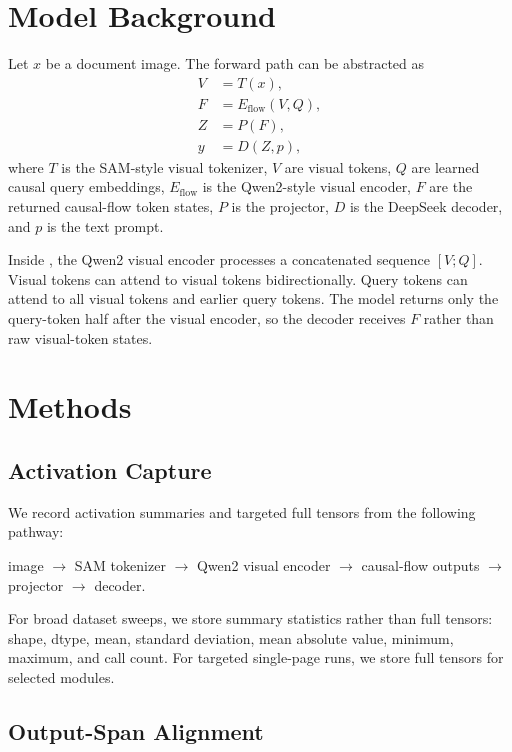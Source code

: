 \documentclass{article}
\begin{document}
\section{Model Background}

Let $x$ be a document image. The \modelname{} forward path can be abstracted as
\begin{align}
  V &= T(x), \\
  F &= E_{\mathrm{flow}}(V, Q), \\
  Z &= P(F), \\
  y &= D(Z, p),
\end{align}
where $T$ is the SAM-style visual tokenizer, $V$ are visual tokens, $Q$ are learned causal query embeddings, $E_{\mathrm{flow}}$ is the Qwen2-style visual encoder, $F$ are the returned causal-flow token states, $P$ is the projector, $D$ is the DeepSeek decoder, and $p$ is the text prompt.

Inside \encodername{}, the Qwen2 visual encoder processes a concatenated sequence $[V; Q]$. Visual tokens can attend to visual tokens bidirectionally. Query tokens can attend to all visual tokens and earlier query tokens. The model returns only the query-token half after the visual encoder, so the decoder receives $F$ rather than raw visual-token states.

\section{Methods}

\subsection{Activation Capture}

We record activation summaries and targeted full tensors from the following pathway:
\begin{center}
image $\rightarrow$ SAM tokenizer $\rightarrow$ Qwen2 visual encoder $\rightarrow$ causal-flow outputs $\rightarrow$ projector $\rightarrow$ decoder.
\end{center}

For broad dataset sweeps, we store summary statistics rather than full tensors: shape, dtype, mean, standard deviation, mean absolute value, minimum, maximum, and call count. For targeted single-page runs, we store full tensors for selected modules.

\subsection{Output-Span Alignment}
\end{document}
